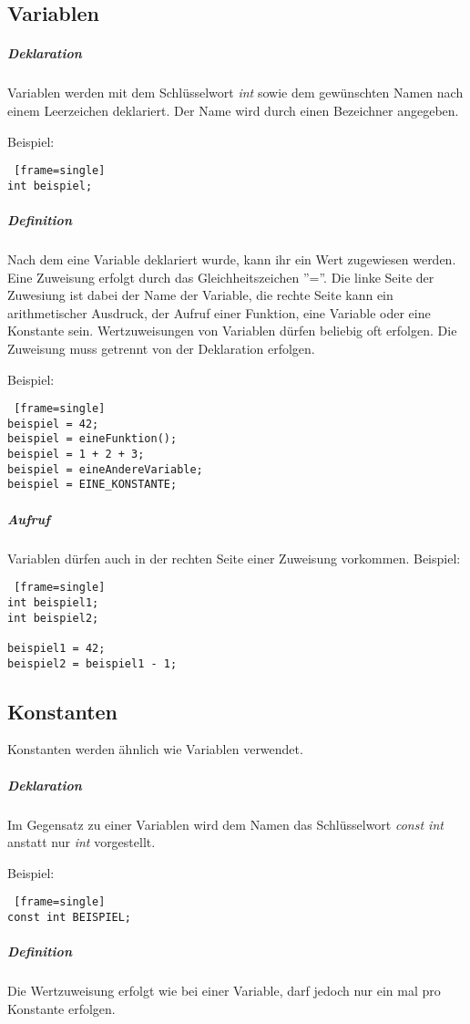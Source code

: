 \subsection*{Variablen}
\subparagraph{Deklaration}
Variablen werden mit dem Schlüsselwort \textit{int} sowie dem gewünschten Namen nach einem Leerzeichen deklariert.
Der Name wird durch einen Bezeichner angegeben.

Beispiel:
\begin{lstlisting} [frame=single] 
int beispiel;
\end{lstlisting}

\subparagraph{Definition}
Nach dem eine Variable deklariert wurde, kann ihr ein Wert zugewiesen werden. Eine Zuweisung erfolgt durch das Gleichheitszeichen ''=''. Die linke Seite der Zuwesiung ist dabei der Name der Variable, die rechte Seite  kann ein arithmetischer Ausdruck, der Aufruf einer Funktion, eine Variable oder eine Konstante sein.
Wertzuweisungen von Variablen dürfen beliebig oft erfolgen.
Die Zuweisung muss getrennt von der Deklaration erfolgen.

Beispiel:
\begin{lstlisting} [frame=single] 
beispiel = 42;
beispiel = eineFunktion();
beispiel = 1 + 2 + 3;
beispiel = eineAndereVariable;
beispiel = EINE_KONSTANTE;
\end{lstlisting}

\subparagraph{Aufruf}
Variablen dürfen auch in der rechten Seite einer Zuweisung vorkommen.
Beispiel:
\begin{lstlisting} [frame=single] 
int beispiel1;
int beispiel2;

beispiel1 = 42;
beispiel2 = beispiel1 - 1;
\end{lstlisting}


\subsection*{Konstanten}
Konstanten werden ähnlich wie Variablen verwendet.

\subparagraph{Deklaration}
Im Gegensatz zu einer Variablen wird dem Namen das Schlüsselwort \textit{const int} anstatt nur \textit{int} vorgestellt.

Beispiel:
\begin{lstlisting} [frame=single] 
const int BEISPIEL;
\end{lstlisting}

\subparagraph{Definition}
Die Wertzuweisung erfolgt wie bei einer Variable, darf jedoch nur ein mal pro Konstante erfolgen.
 

